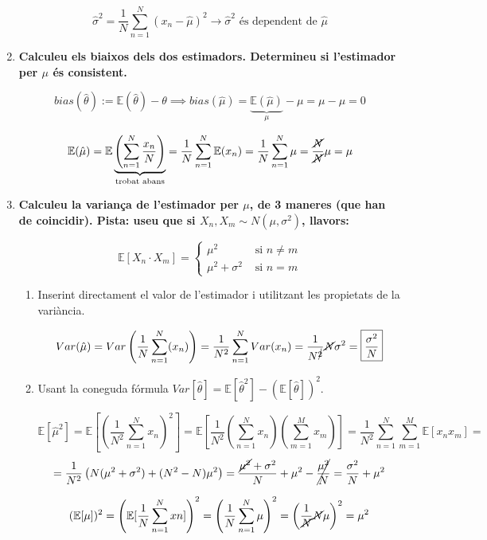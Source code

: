 \documentclass[a4paper]{article}
\begin{document}
\begin{enumerate}
$$ \hat{\sigma}^2 = \frac{1}{N} \sum_{n=1}^N (x_n - \hat{\mu})^2 \rightarrow \hat{\sigma}^2 \text{ és dependent de } \hat{\mu}$$

\item \textbf{Calculeu els biaixos dels dos estimadors. Determineu si l'estimador per $\mu$ és consistent.}

$$ bias(\hat{\theta}) := \mathbb{E}(\hat{\theta}) - \theta \implies bias(\hat{\mu}) = \underbrace{\mathbb{E}(\hat{\mu})}_{\mu} - \mu = \mu - \mu = 0 $$

$$ \mathbb{E}(\hat{\mu}) = \mathbb{E}\underbrace{\left(\sum_{n=1}^N \frac{x_n}{N}\right)}_{\text{trobat abans}} = \frac{1}{N}\sum_{n=1}^N \mathbb{E}(x_n) = \frac{1}{N}\sum_{n=1}^N \mu = \frac{\cancel{N}}{\cancel{N}}\mu = \mu$$


\item \textbf{Calculeu la variança de l'estimador per $\mu$, de 3 maneres (que han de coincidir). Pista: useu que si $X_n, X_m \sim N(\mu, \sigma^2)$, llavors:}

$$ \mathbb{E}[X_n · X_m] = 
\begin{cases}
\mu^2 & \text{ si } n \ne m \\
\mu^2 + \sigma^2 & \text{ si } n = m
\end{cases}$$

\begin{enumerate}
    \item Inserint directament el valor de l'estimador i utilitzant les propietats de la variància.
    
    $$ Var(\hat{\mu}) = Var\left(\frac{1}{N} \sum_{n=1}^{N}(x_n)\right) = \frac{1}{N^2} \sum_{n=1}^{N}Var(x_n) = \frac{1}{N^{\cancel{2}}}\cancel{N}\sigma^2 = \boxed{\frac{\sigma^2}{N}}    $$
    
    \item Usant la coneguda fórmula $Var[\hat{\theta}] = \mathbb{E}[\hat{\theta}^2] - (\mathbb{E}[\hat{\theta}])^2$.
    
    $$ \mathbb{E}[\hat{\mu}^2]  = \mathbb{E}\left[\left(\frac{1}{N^2}\sum_{n=1}^{N}x_n\right)^2\right] =
    \mathbb{E}\left[\frac{1}{N^2} \left(\sum_{n=1}^{N}x_n\right)\left(\sum_{m=1}^{M}x_m\right)\right] = \frac{1}{N^2}\sum_{n=1}^{N}\sum_{m=1}^{M}\mathbb{E}[x_n x_m] = $$
    $$ = \frac{1}{N^2}\left(N(\mu^2+\sigma^2)+(N^2-N)\mu^2\right) = \frac{\cancel{\mu^2}+\sigma^2}{N}+\mu^2-\cancel{\frac{\mu^2}{N}} = \frac{\sigma^2}{N}+\mu^2 $$
    
    $$ (\mathbb{E}[\mu])^2 = \left(\mathbb{E}[\frac{1}{N}\sum_{n=1}^{N}xn]\right)^2 = \left(\frac{1}{N}\sum_{n=1}^{N}\mu\right)^2 = \left(\frac{1}{\cancel{N}} \cancel{N} \mu\right)^2 = \mu^2 $$
    

\end{enumerate}
\end{enumerate}
\end{document}
